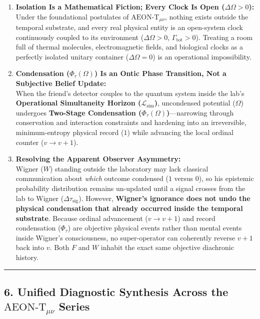 \documentclass[
]{article}
\providecommand{\tightlist}{%
  \setlength{\itemsep}{0pt}\setlength{\parskip}{0pt}}
\begin{document}
\begin{enumerate}
\def\labelenumi{\arabic{enumi}.}
\tightlist
\item
  \textbf{Isolation Is a Mathematical Fiction; Every Clock Is Open
  (\(\Delta\Omega > 0\)):}\\
  Under the foundational postulates of \(\text{AEON-T}_{\mu\nu}\),
  nothing exists outside the temporal substrate, and every real physical
  entity is an open-system clock continuously coupled to its environment
  (\(\Delta\Omega > 0\), \(\Gamma_{\mathrm{tot}} > 0\)). Treating a room
  full of thermal molecules, electromagnetic fields, and biological
  clocks as a perfectly isolated unitary container
  (\(\Delta\Omega = 0\)) is an operational impossibility.
\item
  \textbf{Condensation (\(\Phi_\tau(\Omega)\)) Is an Ontic Phase
  Transition, Not a Subjective Belief Update:}\\
  When the friend's detector couples to the quantum system inside the
  lab's \textbf{Operational Simultaneity Horizon
  (\(\mathcal{L}_{\mathrm{sim}}\))}, uncondensed potential (\(\Omega\))
  undergoes \textbf{Two-Stage Condensation
  (\(\Phi_\tau(\Omega)\))}---narrowing through conservation and
  interaction constraints and hardening into an irreversible,
  minimum-entropy physical record (\(1\)) while advancing the local
  ordinal counter (\(v \to v + 1\)).
\item
  \textbf{Resolving the Apparent Observer Asymmetry:}\\
  Wigner (\(W\)) standing outside the laboratory may lack classical
  communication about \emph{which} outcome condensed (\(1\) versus
  \(0\)), so his epistemic probability distribution remains un-updated
  until a signal crosses from the lab to Wigner
  (\(\Delta\tau_{\mathrm{sig}}\)). However, \textbf{Wigner's ignorance
  does not undo the physical condensation that already occurred inside
  the temporal substrate}. Because ordinal advancement (\(v \to v + 1\))
  and record condensation (\(\Phi_\tau\)) are objective physical events
  rather than mental events inside Wigner's consciousness, no
  super-operator can coherently reverse \(v + 1\) back into \(v\). Both
  \(F\) and \(W\) inhabit the exact same objective diachronic history.
\end{enumerate}

\begin{center}\rule{0.5\linewidth}{0.5pt}\end{center}

\subsection{\texorpdfstring{6. Unified Diagnostic Synthesis Across the
\(\text{AEON-T}_{\mu\nu}\)
Series}{6. Unified Diagnostic Synthesis Across the \textbackslash text\{AEON-T\}\_\{\textbackslash mu\textbackslash nu\} Series}}\label{unified-diagnostic-synthesis-across-the-textaeon-t_munu-series}
\end{document}
